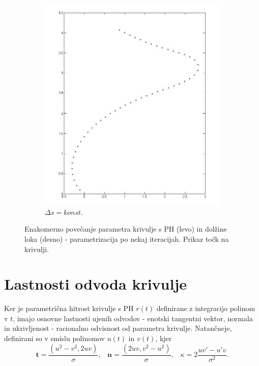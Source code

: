 \documentclass[a4paper]{IEEEtran}
\begin{document}
\begin{figure}[h]
		\begin{subfigure}{.4\textwidth}
			\centering
			\includegraphics[width=\linewidth]{konstDs.jpg}
			\caption{$\Delta s=konst.$}
			\label{fig:constDs}
		\end{subfigure}
		\caption{Enakomerno povečanje parametra krivulje s PH (levo) in dolžine loka (desno) - parametrizacija po nekaj iteracijah. Prikaz točk na krivulji.}
		\label{fig:constD}
	\end{figure}
	
	\section{Lastnosti odvoda krivulje}
	Ker je parametrična hitrost krivulje s PH $r (t)$ definirane z integracijo polinom v $t$, imajo osnovne lastnosti njenih odvodov - enotski tangentni vektor, normala in ukrivljenost - racionalno odvisnost od parametra krivulje. Natančneje, definirani so v smislu polinomov $u (t)$ in $v (t)$, kjer
	$$\textbf{t} =\frac{(u^2 - v^2, 2uv)}{\sigma},\hspace{10pt} \textbf{n} =\frac{(2uv, v^2 - u^2)}{\sigma},\hspace{10pt} \kappa = 2 \frac{uv\prime - u\prime v}{\sigma^2}.$$
	
\end{document}
